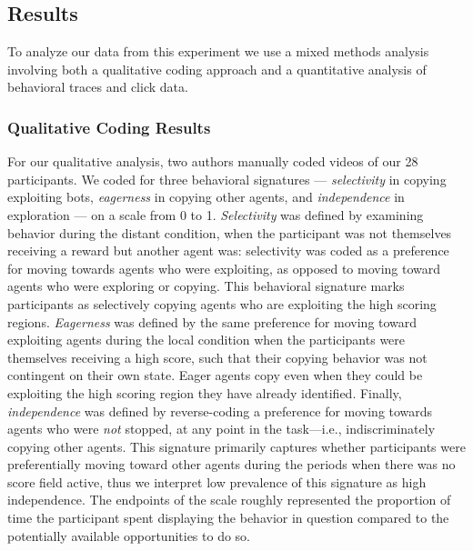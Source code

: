 \documentclass[12pt,letterpaper]{article}
\begin{document}

\subsection{Results}

To analyze our data from this experiment we use a mixed methods analysis involving both a qualitative coding approach and a quantitative analysis of behavioral traces and click data. 

\subsubsection{Qualitative Coding Results}

For our qualitative analysis, two authors manually coded videos of our 28 participants. We coded for three behavioral signatures --- \emph{selectivity} in copying exploiting bots, \emph{eagerness} in copying other agents, and \emph{independence} in exploration --- on a scale from 0 to 1. \emph{Selectivity} was defined by examining behavior during the distant condition, when the participant was not themselves receiving a reward but another agent was: selectivity was coded as a preference for moving towards agents who were exploiting, as opposed to moving toward agents who were exploring or copying. This behavioral signature marks participants as selectively copying agents who are exploiting the high scoring regions.
\emph{Eagerness} was defined by the same preference for moving toward exploiting agents during the local condition when the participants were themselves receiving a high score, such that their copying behavior was not contingent on their own state. Eager agents copy even when they could be exploiting the high scoring region they have already identified.
Finally, \emph{independence} was defined by reverse-coding a preference for moving towards agents who were \emph{not} stopped, at any point in the task---i.e., indiscriminately copying other agents. This signature primarily captures whether participants were preferentially moving toward other agents during the periods when there was no score field active, thus we interpret low prevalence of this signature as high independence. 
The endpoints of the scale roughly represented the proportion of time the participant spent displaying the behavior in question compared to the potentially available opportunities to do so. 
\end{document}
